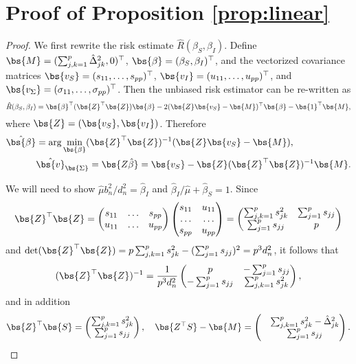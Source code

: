 \appendix

\section{Proof of Proposition \ref{prop:linear}}

\begin{proof}
  We first rewrite the risk estimate $\hat{R}(\beta_S, \beta_I)$. Define $\bs{M}=(\sum_{j,k=1}^p\hat{\Delta}_{jk}^2, 0)^\top$, $\bs{\beta} = (\beta_S, \beta_I)^\top$, and the vectorized covariance matrices $\bs{v_S}=(s_{11},\ldots, s_{pp})^\top $, $\bs{v_I}=(u_{11},\ldots, u_{pp})^\top $, and $\bs{v_{\Sigma}} = (\sigma_{11},\ldots,\sigma_{pp})^\top$. Then the unbiased risk estimator can be re-written as
  \[
  \hat{R}(\beta_S,\beta_I) = \bs{\beta}^\top (\bs{Z}^\top \bs{Z})\bs{\beta} - 2(\bs{Z}\bs{v_S}-\bs{M})^\top \bs{\beta} - \bs{1}^\top \bs{M},
  \]
  where $\bs{Z} =(\bs{v_S}, \bs{v_I})$. Therefore
  \begin{align*}
    \hat{\bs{\beta}} &= \arg\min_{ \bs{\beta} }(\bs{Z}^\top \bs{Z})^{-1}(\bs{Z}\bs{v_S}-\bs{M}),\\
    &
    \hat{\bs{v}}_{\bs{\Sigma}} = \bs{Z\hat{\beta}} = \bs{v_S} - \bs{Z}(\bs{Z}^\top \bs{Z})^{-1}\bs{M}.
  \end{align*}

  We will need to show $\hat{\mu} b_n^2 / d_n^2 = \hat{\beta}_I$ and $\hat{\beta}_I/\hat{\mu} + \hat{\beta}_S = 1$. Since
$$\bs{Z}^\top \bs{Z} = \begin{pmatrix}
s_{11} &\ldots &s_{pp} \\
u_{11} &\ldots &u_{pp} 
\end{pmatrix}\begin{pmatrix}
s_{11}  &u_{11} \\
\ldots&\ldots\\
s_{pp} &u_{pp} 
\end{pmatrix}=\begin{pmatrix}
\sum_{j,k=1}^ps_{jk}^2 & \sum_{j=1}^ps_{jj}\\
\sum_{j=1}^ps_{jj} & p
\end{pmatrix}$$
and
$\text{det}( \bs{Z}^\top \bs{Z} ) = p\sum_{j,k=1}^ps_{jk}^2 - (\sum_{j=1}^p s_{jj})^2 = p^3d_n^2$, it follows that
$$(\bs{Z}^\top \bs{Z})^{-1} = \frac{1}{p^3d_n^2}\begin{pmatrix}
p & -\sum_{j=1}^p s_{jj}\\
-\sum_{j=1}^p s_{jj} & \sum_{j,k=1}^ps_{jk}^2
\end{pmatrix},$$
and in addition
$$\bs{Z}^\top \bs{S} = \begin{pmatrix}
\sum_{j,k=1}^ps_{jk}^2\\
\sum_{j=1}^p s_{jj}
\end{pmatrix},
\quad 
\bs{Z^\top S}-\bs{M} =  \begin{pmatrix}
&\sum_{j,k=1}^ps_{jk}^2 - \hat{\Delta}_{jk}^2\\
&\sum_{j=1}^p s_{jj}
\end{pmatrix}.$$


\end{proof}
